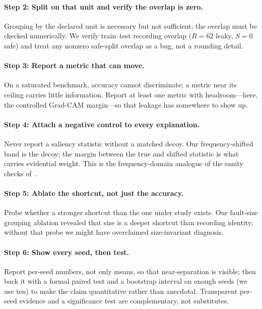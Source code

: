 \documentclass[11pt]{article}
\begin{document}
\paragraph{Step 2: Split on that unit and verify the overlap is zero.}
Grouping by the declared unit is necessary but not sufficient; the overlap must be checked
numerically. We verify train--test recording overlap ($R{=}62$ leaky, $S{=}0$ safe) and
treat any nonzero safe-split overlap as a bug, not a rounding detail.

\paragraph{Step 3: Report a metric that can move.}
On a saturated benchmark, accuracy cannot discriminate; a metric near its ceiling carries
little information. Report at least one metric with headroom---here, the controlled
Grad-CAM margin---so that leakage has somewhere to show up.

\paragraph{Step 4: Attach a negative control to every explanation.}
Never report a saliency statistic without a matched decoy. Our frequency-shifted band is
the decoy; the margin between the true and shifted statistic is what carries evidential
weight. This is the frequency-domain analogue of the sanity checks
of~\cite{adebayo2018sanity}.

\paragraph{Step 5: Ablate the shortcut, not just the accuracy.}
Probe whether a stronger shortcut than the one under study exists. Our fault-size grouping
ablation revealed that size is a deeper shortcut than recording identity; without that
probe we might have overclaimed size-invariant diagnosis.

\paragraph{Step 6: Show every seed, then test.}
Report per-seed numbers, not only means, so that near-separation is visible; then back it
with a formal paired test and a bootstrap interval on enough seeds (we use ten) to make the
claim quantitative rather than anecdotal. Transparent per-seed evidence and a significance
test are complementary, not substitutes.
\end{document}
